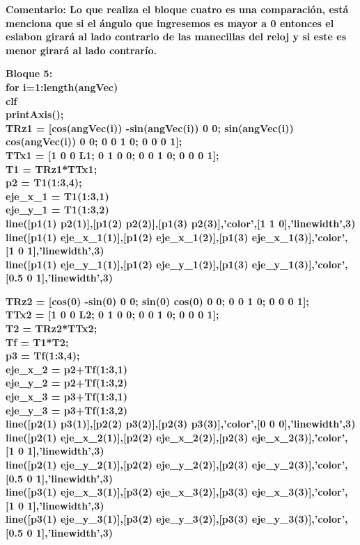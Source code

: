 \documentclass[10pt,a4paper]{article}
\begin{document}
\begin{flushleft}
\textbf{Comentario: Lo que realiza el bloque cuatro es una comparación, está menciona que si el ángulo que ingresemos es mayor a 0 entonces el eslabon girará al lado contrario de las manecillas del reloj y si este es menor girará al lado contrarío.}
\end{flushleft}

\begin{flushleft}
\textbf{Bloque 5:\\
for i=1:length(angVec)\\
clf\\
printAxis();\\
TRz1 = [cos(angVec(i)) -sin(angVec(i)) 0 0; sin(angVec(i)) cos(angVec(i)) 0 0; 0 0 1 0; 0 0 0 1];\\
TTx1 = [1 0 0 L1; 0 1 0 0; 0 0 1 0; 0 0 0 1];\\
T1 = TRz1*TTx1;\\
p2 = T1(1:3,4);\\
eje\_x\_1 = T1(1:3,1)\\
eje\_y\_1 = T1(1:3,2)\\
line([p1(1) p2(1)],[p1(2) p2(2)],[p1(3) p2(3)],'color',[1 1 0],'linewidth',3)\\
line([p1(1) eje\_x\_1(1)],[p1(2) eje\_x\_1(2)],[p1(3) eje\_x\_1(3)],'color',[1 0 1],'linewidth',3)\\
line([p1(1) eje\_y\_1(1)],[p1(2) eje\_y\_1(2)],[p1(3) eje\_y\_1(3)],'color',[0.5 0 1],'linewidth',3)\\
  }
\end{flushleft}

\begin{flushleft}
\textbf{TRz2 = [cos(0) -sin(0) 0 0; sin(0) cos(0) 0 0; 0 0 1 0; 0 0 0 1];\\
TTx2 = [1 0 0 L2; 0 1 0 0; 0 0 1 0; 0 0 0 1];\\
T2 = TRz2*TTx2;\\
Tf = T1*T2;\\
p3 = Tf(1:3,4);\\
eje\_x\_2 = p2+Tf(1:3,1)\\
eje\_y\_2 = p2+Tf(1:3,2)\\
eje\_x\_3 = p3+Tf(1:3,1)\\
eje\_y\_3 = p3+Tf(1:3,2)\\
line([p2(1) p3(1)],[p2(2) p3(2)],[p2(3) p3(3)],'color',[0 0 0],'linewidth',3)\\
line([p2(1) eje\_x\_2(1)],[p2(2) eje\_x\_2(2)],[p2(3) eje\_x\_2(3)],'color',[1 0 1],'linewidth',3)\\
line([p2(1) eje\_y\_2(1)],[p2(2) eje\_y\_2(2)],[p2(3) eje\_y\_2(3)],'color',[0.5 0 1],'linewidth',3)\\
line([p3(1) eje\_x\_3(1)],[p3(2) eje\_x\_3(2)],[p3(3) eje\_x\_3(3)],'color',[1 0 1],'linewidth',3)\\
line([p3(1) eje\_y\_3(1)],[p3(2) eje\_y\_3(2)],[p3(3) eje\_y\_3(3)],'color',[0.5 0 1],'linewidth',3)\\
}
\end{flushleft}
\end{document}
